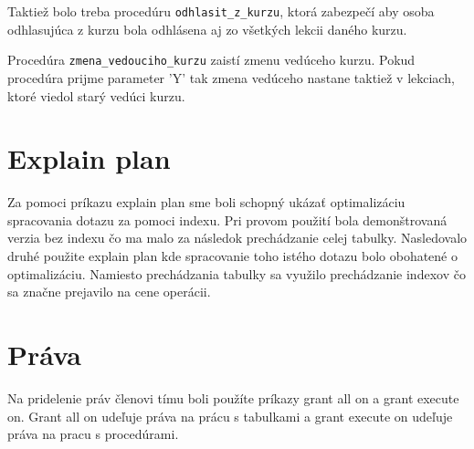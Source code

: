 \documentclass[11pt]{article}
\begin{document}
Taktiež bolo treba procedúru \texttt{odhlasit\_z\_kurzu}, ktorá zabezpečí 
aby osoba odhlasujúca z kurzu bola odhlásena aj zo všetkých lekcii daného kurzu. 

Procedúra \texttt{zmena\_vedouciho\_kurzu} zaistí zmenu vedúceho kurzu. Pokud procedúra prijme parameter 'Y'
tak zmena vedúceho nastane taktiež v lekciach, ktoré viedol starý vedúci kurzu.

\section{Explain plan}
Za pomoci príkazu explain plan sme boli schopný ukázať optimalizáciu spracovania dotazu za pomoci indexu.
Pri provom použití bola demonštrovaná verzia bez indexu čo ma malo za následok prechádzanie celej tabulky.
Nasledovalo druhé použite explain plan kde spracovanie toho istého dotazu bolo obohatené o optimalizáciu.
Namiesto prechádzania tabulky sa využilo prechádzanie  indexov čo sa značne prejavilo na cene operácii.

\section{Práva}
Na pridelenie práv členovi tímu boli použíte príkazy grant all on a grant execute on.
Grant all on udeľuje práva na prácu s tabulkami a grant execute on udeľuje práva na pracu s procedúrami.
\end{document}

